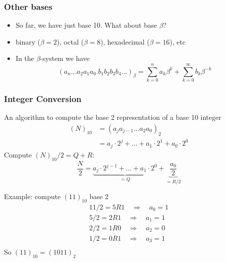 \documentclass[10pt]{beamer}
\begin{document}
\begin{frame}
\frametitle{Other bases}
  \begin{itemize}
    \item So far, we have just base 10.  What about base $\beta$?
    \item binary ($\beta = 2$), octal ($\beta = 8$), hexadecimal ($\beta
= 16$), etc
    \item In the $\beta$-system we have
  \begin{equation*}
        (a_n\dots a_2a_1a_0.b_1b_2b_3b_4\dots)_{\beta} =
\sum_{k=0}^{n}a_k\beta^{k} + \sum_{k=0}^{\infty} b_k \beta^{-k}
\end{equation*}
\end{itemize}
\end{frame}
\begin{frame}[shrink]
\frametitle{Integer Conversion}
An algorithm to compute the base 2 representation of a base 10 integer
\begin{align*}
(N)_{10} & = (a_j a_{j-1}\dots a_2 a_0)_2\\
& = a_j\cdot 2^j + \dots + a_1\cdot 2^1 + a_0\cdot 2^0
\end{align*}
Compute $(N)_{10}/2 = Q + R$:
\begin{equation*}
  \frac{N}{2} = 
\underbrace{a_j\cdot 2^{j-1} + \dots + a_1\cdot 2^0}_{=Q} +
\underbrace{\frac{a_0}{2}}_{=R/2}
\end{equation*}
\begin{example}{Example: compute $(11)_{10}$ base 2}
\begin{align*}
11/2 = 5R1 \quad\Rightarrow\quad a_0 = 1\\
5/2 = 2R1 \quad\Rightarrow\quad a_1 = 1\\
2/2 = 1R0 \quad\Rightarrow\quad a_2 = 0\\
1/2 = 0R1 \quad\Rightarrow\quad a_3 = 1\\
\end{align*}
So $(11)_{10} = (1011)_{2}$
\end{example}
\end{frame}
\end{document}
